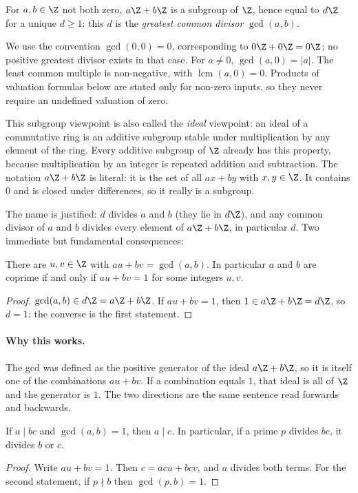 \begin{definition}
For $a,b\in\Z$ not both zero, $a\Z+b\Z$ is a subgroup of $\Z$, hence equal to $d\Z$ for a unique $d\ge1$: this $d$ is the \emph{greatest common divisor} $\gcd(a,b)$.
\end{definition}

We use the convention $\gcd(0,0)=0$, corresponding to
$0\Z+0\Z=0\Z$; no positive greatest divisor exists in that case.
For $a\ne0$, $\gcd(a,0)=|a|$. The least common multiple is non-negative,
with $\operatorname{lcm}(a,0)=0$. Products of valuation formulas below
are stated only for non-zero inputs, so they never require an undefined
valuation of zero.

This subgroup viewpoint is also called the \emph{ideal} viewpoint: an ideal of a commutative ring is an additive subgroup stable under multiplication by any element of the ring. Every additive subgroup of $\Z$ already has this property, because multiplication by an integer is repeated addition and subtraction. The notation $a\Z+b\Z$ is literal: it is the set of all $ax+by$ with $x,y\in\Z$. It contains $0$ and is closed under differences, so it really is a subgroup.

The name is justified: $d$ divides $a$ and $b$ (they lie in $d\Z$), and any common divisor of $a$ and $b$ divides every element of $a\Z+b\Z$, in particular $d$. Two immediate but fundamental consequences:

\begin{theorem}[B\'ezout]\label{thm:bezout}
There are $u,v\in\Z$ with $au+bv=\gcd(a,b)$. In particular $a$ and $b$ are coprime if and only if $au+bv=1$ for some integers $u,v$.
\end{theorem}
\begin{proof}
$\gcd(a,b)\in d\Z=a\Z+b\Z$. If $au+bv=1$, then $1\in a\Z+b\Z=d\Z$, so $d=1$; the converse is the first statement.
\end{proof}

\paragraph{Why this works.}
The gcd was defined as the positive generator of the ideal $a\Z+b\Z$, so it is itself one of the combinations $au+bv$. If a combination equals $1$, that ideal is all of $\Z$ and the generator is $1$. The two directions are the same sentence read forwards and backwards.

\begin{theorem}\label{thm:gauss}
If $a\mid bc$ and $\gcd(a,b)=1$, then $a\mid c$. In particular, if a prime $p$ divides $bc$, it divides $b$ or $c$.
\end{theorem}
\begin{proof}
Write $au+bv=1$. Then $c=acu+bcv$, and $a$ divides both terms. For the second statement, if $p\nmid b$ then $\gcd(p,b)=1$.
\end{proof}

